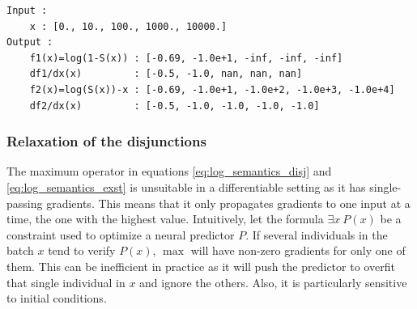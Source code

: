 \documentclass{article}
\theoremstyle{definition}
\begin{document}
\begin{verbatim}
Input :
    x : [0., 10., 100., 1000., 10000.]
Output :
    f1(x)=log(1-S(x)) : [-0.69, -1.0e+1, -inf, -inf, -inf]
    df1/dx(x)         : [-0.5, -1.0, nan, nan, nan]
    f2(x)=log(S(x))-x : [-0.69, -1.0e+1, -1.0e+2, -1.0e+3, -1.0e+4]
    df2/dx(x)         : [-0.5, -1.0, -1.0, -1.0, -1.0]
\end{verbatim}



\subsubsection{Relaxation of the disjunctions}
\label{s:logsumexp}
The maximum operator in equations \eqref{eq:log_semantics_disj} and \eqref{eq:log_semantics_exst} is unsuitable in a differentiable setting as it has single-passing gradients.
This means that it only propagates gradients to one input at a time, the one with the highest value.
Intuitively, let the formula $\exists x \ P(x)$ be a constraint used to optimize a neural predictor $P$.
If several individuals in the batch $x$ tend to verify $P(x)$, $\max$ will have non-zero gradients for only one of them.
This can be inefficient in practice as it will push the predictor to overfit that single individual in $x$ and ignore the others. Also, it is particularly sensitive to initial conditions.
\end{document}
